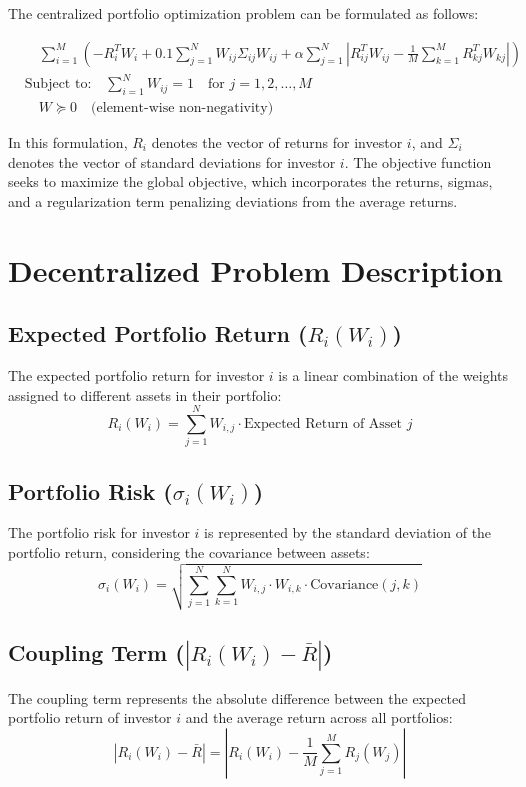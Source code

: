 \documentclass{article}
\begin{document}
	The centralized portfolio optimization problem can be formulated as follows:
	
	\begin{align*}
		& \quad \sum_{i=1}^{M} \left( -R_i^T W_i + 0.1 \sum_{j=1}^{N} W_{ij} \Sigma_{ij} W_{ij} + \alpha \sum_{j=1}^{N} \left| R_{ij}^T W_{ij} - \frac{1}{M} \sum_{k=1}^{M} R_{kj}^T W_{kj} \right| \right) \\
		& \text{Subject to:} \quad \sum_{i=1}^{N} W_{ij} = 1 \quad \text{for } j = 1, 2, \ldots, M \\
		& \quad W \succeq 0 \quad \text{(element-wise non-negativity)}
	\end{align*}
	
	In this formulation, $R_i$ denotes the vector of returns for investor $i$, and $\Sigma_i$ denotes the vector of standard deviations for investor $i$. The objective function seeks to maximize the global objective, which incorporates the returns, sigmas, and a regularization term penalizing deviations from the average returns.
	
	
	\section*{Decentralized Problem Description}
	
	\subsection*{Expected Portfolio Return ($R_i(W_i)$)}
	The expected portfolio return for investor $i$ is a linear combination of the weights assigned to different assets in their portfolio:
	\[ R_i(W_i) = \sum_{j=1}^{N} W_{i,j} \cdot \text{Expected Return of Asset } j \]
	
	\subsection*{Portfolio Risk ($\sigma_i(W_i)$)}
	The portfolio risk for investor $i$ is represented by the standard deviation of the portfolio return, considering the covariance between assets:
	\[ \sigma_i(W_i) = \sqrt{\sum_{j=1}^{N} \sum_{k=1}^{N} W_{i,j} \cdot W_{i,k} \cdot \text{Covariance}(j, k)} \]
	
	\subsection*{Coupling Term ($|R_i(W_i) - \bar{R}|$)}
	The coupling term represents the absolute difference between the expected portfolio return of investor $i$ and the average return across all portfolios:
	\[ |R_i(W_i) - \bar{R}| = \left|R_i(W_i) - \frac{1}{M} \sum_{j=1}^{M} R_j(W_j)\right| \]
	
\end{document}
